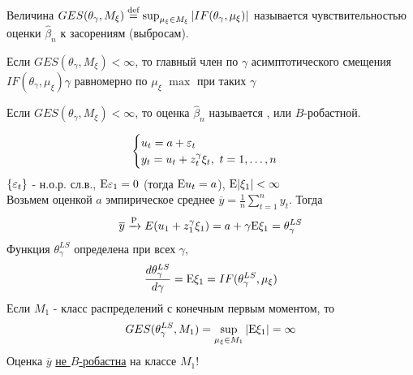 \begin{definition}
    Величина $GES(\theta_\gamma,M_\xi)\stackrel{\text{def}}{=}\sup_{\mu_\xi\in M_\xi}\left\lvert IF(\theta_\gamma, \mu_\xi)\right\rvert$
    называется чувствительностью оценки $\widehat{\beta}_n$ к засорениям (выбросам).
\end{definition}
\begin{leftbar}
    Если $GES(\theta_\gamma,M_\xi)<\infty$, то главный член по $\gamma$
    асимптотического смещения $IF(\theta_\gamma,\mu_\xi)\gamma$
    равномерно по $\mu_\xi$ $\max$ при таких $\gamma$
\end{leftbar}
\begin{definition}
    Если $GES(\theta_\gamma,M_\xi)<\infty$, то оценка $\widehat{\beta}_n$
    называется , или $B$-робастной.
\end{definition}

\begin{example}
    \[\begin{cases}
        u_t = a + \varepsilon_t \\
        y_t = u_t + z^\gamma_t\xi_t, \ t=1,\ldots,n
    \end{cases}\]
    $\{\varepsilon_t\}$ - н.о.р. сл.в., $\mathrm{E}\varepsilon_1=0$ (тогда $\mathrm{E} u_t=a$), $\mathrm{E}\vert\xi_1\vert<\infty$ \\
    Возьмем оценкой $a$ эмпирическое среднее $\overline{y}=\frac{1}{n}\sum_{t=1}^ny_t$.
    Тогда 
    \[\overline{y}\xrightarrow{\mathrm{P}}E(u_1+z_1^\gamma\xi_1)=a+\gamma\mathrm{E}\xi_1=\theta^{LS}_\gamma\]
    Функция $\theta_\gamma^{LS}$ определена при всех $\gamma$,
    \[\frac{d\theta_\gamma^{LS}}{d\gamma}=\mathrm{E}\xi_1=IF(\theta_\gamma^{LS}, \mu_\xi)\]
    Если $M_1$ - класс распределений с конечным первым моментом, то
    \[GES(\theta_\gamma^{LS}, M_1) = \sup_{\mu_\xi\in M_1} \vert\mathrm{E}\xi_1\vert = \infty\]
    Оценка $\overline{y}$ \underline{не $B$-робастна} на  классе $M_1$!
\end{example}

